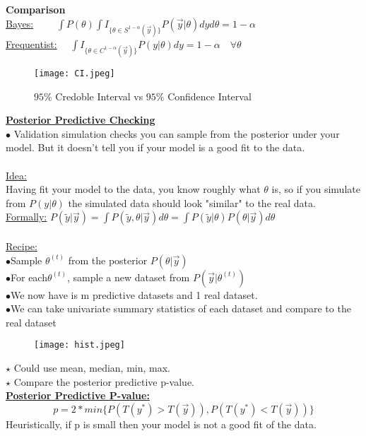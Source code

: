 \documentclass[11pt,a4paper]{article}
\begin{document}
\textbf{Comparison}\\
\underline{Bayes:} $\qquad \int P(\theta) \int I_{\{\theta\in S^{1-\alpha}(\overrightarrow{y})\}}P(\overrightarrow{y}|\theta)dyd\theta = 1-\alpha$\\
\underline{Frequentist:} $\quad \int I_{\{\theta\in C^{1-\alpha}(\overrightarrow{y})\}}P(y|\theta)dy = 1-\alpha \quad \forall\theta$ \\
\begin{figure}[H]
  \centering
  \texttt{[image: CI.jpeg]}
  \caption{$95\%$ Credoble Interval vs $95\%$ Confidence Interval}
 \end{figure}
\noindent
\textbf{\underline{Posterior Predictive Checking}}\\
$\bullet$ Validation simulation checks you can sample from the posterior under your model. But it doesn't tell you if your model is a good fit to the data.\\
\\
\noindent
\underline{Idea:}\\
Having fit your model to the data, you know roughly what $\theta$ is, so if you simulate from $P(y|\theta)$ the simulated data should look "similar" to the real data.\\

\underline{Formally:} $P(\widetilde{y}|\overrightarrow{y})=\int P(\widetilde{y},\theta|\overrightarrow{y}) d\theta =\int P(\widetilde{y}|\theta)P(\theta|\overrightarrow{y})d\theta$\\
\\
\underline{Recipe:}\\
$\bullet$Sample $\theta^{(t)}$ from the posterior $P(\theta|\overrightarrow{y})$\\
$\bullet$For each$\theta^{(t)}$, sample a new dataset from $P(\overrightarrow{y}|\theta^{(t)})$\\
$\bullet$We now have is m predictive datasets and 1 real dataset.\\
$\bullet$We can take univariate summary statistics of each dataset and compare to the real dataset\\
\begin{figure}[H]
  \centering
  \texttt{[image: hist.jpeg]}
 \end{figure}
\indent $\star$ Could use mean, median, min, max.\\
\indent $\star$ Compare the posterior predictive p-value.\\
\underline{\textbf{Posterior Predictive P-value:}} \\
\begin{equation*}
    p = 2 * min\{P(T(y^*)>T(\overrightarrow{y})),P(T(y^*)<T(\overrightarrow{y}))\}
\end{equation*}
Heuristically, if p is small then your model is not a good fit of the data.
\end{document}
